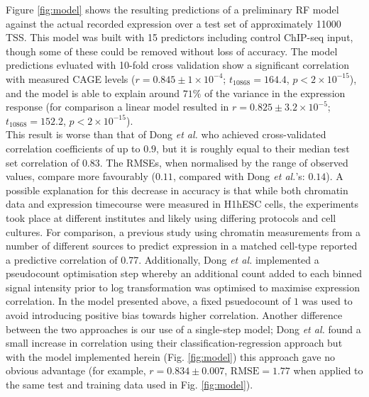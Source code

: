 \documentclass[a4paper]{report}
\begin{document}
Figure \ref{fig:model} shows the resulting predictions of a
preliminary RF model against the actual recorded expression over a
test set of approximately 11000 TSS. This model was built with 15
predictors including control ChIP-seq input, though some of these could be
removed without loss of accuracy. The model predictions evluated with
10-fold cross validation show a
significant correlation with measured CAGE levels ($ r = 0.845\pm
1 \times 10^{-4}$; $t_{10868} = 164.4$,
$p < 2 \times 10^{-15}$), and the model is able to explain around
$71\%$ of the variance in the expression response (for comparison a
linear model resulted in $r = 0.825 \pm 3.2 \times 10^{-5}$; $t_{10868} = 152.2$,
$p < 2 \times 10^{-15}$). \\

This result is worse than that of Dong \emph{et al.}
who achieved cross-validated correlation coefficients of up to $0.9$,
but it is roughly equal to their median test set correlation of
$0.83$.\cite{Dong2012} The RMSEs, when normalised by the range of
observed values, compare more favourably ($0.11$, compared with Dong \emph{et al.}'s: $0.14$). A possible explanation for this decrease in
accuracy is that while both chromatin data and expression timecourse
were measured in H1hESC cells, the experiments took place at
different institutes and likely using differing protocols and cell cultures. For comparison, a previous study using chromatin
measurements from a number of different sources to predict expression
in a matched cell-type reported a predictive correlation of 0.77.\cite{Karlic2010} Additionally, Dong \emph{et al.} implemented a pseudocount
optimisation step whereby an additional count added to each binned signal
intensity prior to log transformation was optimised to maximise
expression correlation. In the model presented above, a fixed
psuedocount of $1$ was used to avoid introducing positive bias towards
higher correlation. Another difference between the two approaches is
our use of a single-step model; Dong \emph{et al.} found a small
increase in correlation using their classification-regression approach
but with the model implemented herein (Fig. \ref{fig:model}) this approach gave no obvious advantage (for
example, $r
= 0.834 \pm 0.007$, $\text{RMSE} = 1.77$ when applied to the same test and
training data used in Fig. \ref{fig:model}). \\
\end{document}
